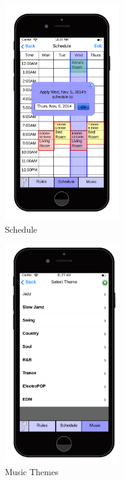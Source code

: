 \documentclass[12pt]{article}
\begin{document}
  \begin{figure}[ht!]
    \centering
    \includegraphics[width=50mm]{Schedule.png}
    \caption{Schedule}
    \label{fig:schedule}
  \end{figure}
  
  \begin{figure}[ht!]
    \centering
    \includegraphics[width=50mm]{iPhone_music_theme.png}
    \caption{Music Themes}
    \label{fig:musicThemes}
  \end{figure}
  
\end{document}
